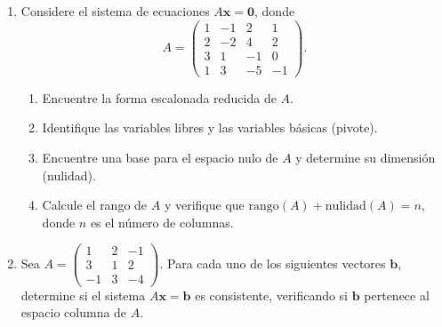 \documentclass[12pt,letterpaper]{article}
\begin{document}
\begin{enumerate}
\begin{enumerate}
        \item $\begin{pmatrix} 0 & 1 & 2 & 3 \\ 1 & 0 & -1 & 2 \\ 2 & 1 & 0 & 7 \\ 3 & 2 & 1 & 12 \end{pmatrix}$

        \item $\begin{pmatrix} a & 0 & 0 \\ 0 & b & 0 \\ 0 & 0 & c \end{pmatrix}$, donde $a, b, c \in \mathbb{R}$. Analice todos los casos posibles.
    \end{enumerate}


    \item Considere el sistema de ecuaciones $A\mathbf{x} = \mathbf{0}$, donde
    \[
    A = \begin{pmatrix} 1 & -1 & 2 & 1 \\ 2 & -2 & 4 & 2 \\ 3 & 1 & -1 & 0 \\ 1 & 3 & -5 & -1 \end{pmatrix}.
    \]
    \begin{enumerate}
        \item Encuentre la forma escalonada reducida de $A$.
        \item Identifique las variables libres y las variables básicas (pivote).
        \item Encuentre una base para el espacio nulo de $A$ y determine su dimensión (nulidad).
        \item Calcule el rango de $A$ y verifique que $\text{rango}(A) + \text{nulidad}(A) = n$, donde $n$ es el número de columnas.
    \end{enumerate}

\newpage
    \item Sea $A = \begin{pmatrix} 1 & 2 & -1 \\ 3 & 1 & 2 \\ -1 & 3 & -4 \end{pmatrix}$.
    Para cada uno de los siguientes vectores $\mathbf{b}$, determine si el sistema $A\mathbf{x} = \mathbf{b}$ es consistente, verificando si $\mathbf{b}$ pertenece al espacio columna de $A$.


\end{enumerate}
\end{document}
